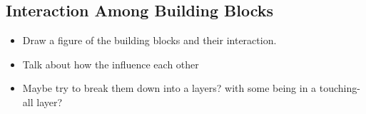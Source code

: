 
\subsection{Interaction Among Building Blocks}

\begin{itemize}
	\item Draw a figure of the building blocks and their interaction. 
	\item Talk about how the influence each other
	\item Maybe try to break them down into a layers? with some being in a touching-all layer?
\end{itemize}